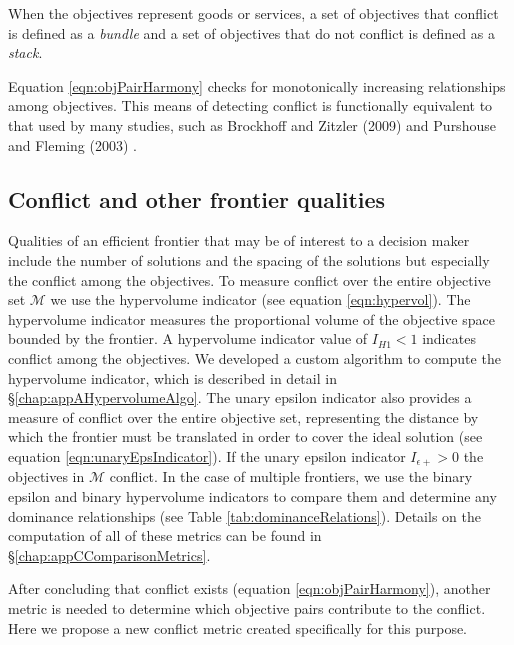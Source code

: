 When the objectives represent goods or services, a set of objectives that conflict is defined as a \textit{bundle} and a set of objectives that do not conflict is defined as a \textit{stack}.

Equation \eqref{eqn:objPairHarmony} checks for monotonically increasing relationships among objectives. This means of detecting conflict is functionally equivalent to that used by many studies, such as Brockhoff and Zitzler (2009) \cite{brockhoff2009objective} and Purshouse and Fleming (2003) \cite{purshouse2003conflict}.

\subsection{Conflict and other frontier qualities}
\label{sec:waysToMeasureFrontiers}
Qualities of an efficient frontier that may be of interest to a decision maker include the number of solutions and the spacing of the solutions but especially the conflict among the objectives. To measure conflict over the entire objective set $\mathcal{M}$ we use the hypervolume indicator (see equation \eqref{eqn:hypervol}). The hypervolume indicator measures the proportional volume of the objective space bounded by the frontier. A hypervolume indicator value of $I_{H1} < 1$ indicates conflict among the objectives. We developed a custom algorithm to compute the hypervolume indicator, which is described in detail in \S \ref{chap:appAHypervolumeAlgo}. The unary epsilon indicator also provides a measure of conflict over the entire objective set, representing the distance by which the frontier must be translated in order to cover the ideal solution (see equation \eqref{eqn:unaryEpsIndicator}). If the unary epsilon indicator $I_{\epsilon+} > 0$ the objectives in $\mathcal{M}$ conflict. In the case of multiple frontiers, we use the binary epsilon and binary hypervolume indicators to compare them and determine any dominance relationships (see Table \ref{tab:dominanceRelations}). Details on the computation of all of these metrics can be found in \S \ref{chap:appCComparisonMetrics}.

After concluding that conflict exists (equation \eqref{eqn:objPairHarmony}), another metric is needed to determine which objective pairs contribute to the conflict. Here we propose a new conflict metric created specifically for this purpose.

